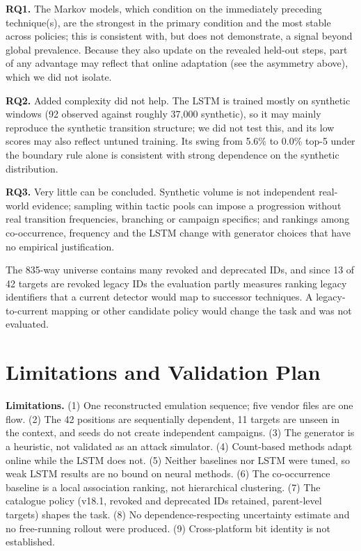 \documentclass[conference]{IEEEtran}
\begin{document}
\textbf{RQ1.} The Markov models, which condition on the immediately preceding technique(s), are the strongest in the primary condition and the most stable across policies; this is consistent with, but does not demonstrate, a signal beyond global prevalence. Because they also update on the revealed held-out steps, part of any advantage may reflect that online adaptation (see the asymmetry above), which we did not isolate.

\textbf{RQ2.} Added complexity did not help. The LSTM is trained mostly on synthetic windows (92 observed against roughly 37{,}000 synthetic), so it may mainly reproduce the synthetic transition structure; we did not test this, and its low scores may also reflect untuned training. Its swing from 5.6\% to 0.0\% top-5 under the boundary rule alone is consistent with strong dependence on the synthetic distribution.

\textbf{RQ3.} Very little can be concluded. Synthetic volume is not independent real-world evidence; sampling within tactic pools can impose a progression without real transition frequencies, branching or campaign specifics; and rankings among co-occurrence, frequency and the LSTM change with generator choices that have no empirical justification.

The 835-way universe contains many revoked and deprecated IDs, and since 13 of 42 targets are revoked legacy IDs the evaluation partly measures ranking legacy identifiers that a current detector would map to successor techniques. A legacy-to-current mapping or other candidate policy would change the task and was not evaluated.

\section{Limitations and Validation Plan}

\textbf{Limitations.} (1) One reconstructed emulation sequence; five vendor files are one flow. (2) The 42 positions are sequentially dependent, 11 targets are unseen in the context, and seeds do not create independent campaigns. (3) The generator is a heuristic, not validated as an attack simulator. (4) Count-based methods adapt online while the LSTM does not. (5) Neither baselines nor LSTM were tuned, so weak LSTM results are no bound on neural methods. (6) The co-occurrence baseline is a local association ranking, not hierarchical clustering. (7) The catalogue policy (v18.1, revoked and deprecated IDs retained, parent-level targets) shapes the task. (8) No dependence-respecting uncertainty estimate and no free-running rollout were produced. (9) Cross-platform bit identity is not established.
\end{document}
